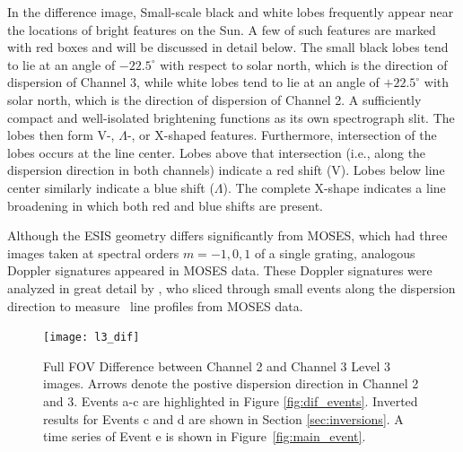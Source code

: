     	
    	In the difference image,
    	Small-scale black and white lobes frequently appear near the locations of bright features on the Sun. A few of such features are marked with red boxes and will be discussed in detail below.  
    	The small black lobes tend to lie at an angle of $-22.5^\circ$ with respect to solar north, which is the direction of dispersion of Channel 3, while white lobes tend to lie at an angle of $+22.5^\circ$ with solar north, which is the direction of dispersion of Channel 2. A sufficiently compact and well-isolated brightening functions as its own spectrograph slit. 
    	The lobes then form V-, $\Lambda$-, or X-shaped features. 
    	Furthermore, intersection of the lobes occurs at the line center. 
    	Lobes above that intersection (i.e., along the dispersion direction in both channels) indicate a red shift (V). 
    	Lobes below line center similarly indicate a blue shift ($\Lambda$). The complete X-shape indicates a line broadening in which both red and blue shifts are present.
    	
    	Although the ESIS geometry differs significantly from MOSES, which had three images taken at spectral orders $m=-1, 0, 1$
    	of a single grating, analogous Doppler signatures appeared in MOSES data. These Doppler signatures were analyzed in great detail by \citet{Rust2019}, who sliced through small events along the dispersion direction to measure \heii \ line profiles from MOSES data.
    	    
   		
  		\begin{figure}[htb!]
  			\centering
  			\texttt{[image: l3\_dif]}
  			\caption{Full FOV Difference between Channel 2 and Channel 3 Level 3 images.  
  			Arrows denote the postive dispersion direction in Channel 2 and 3.
  			Events a-c are highlighted in Figure \ref{fig:dif_events}.    
  			Inverted results for Events c and d are shown in Section \ref{sec:inversions}. 
  			A time series of Event e is shown in Figure~\ref{fig:main_event}.}
  			\label{fig:l3_dif}
  		\end{figure}
   	
